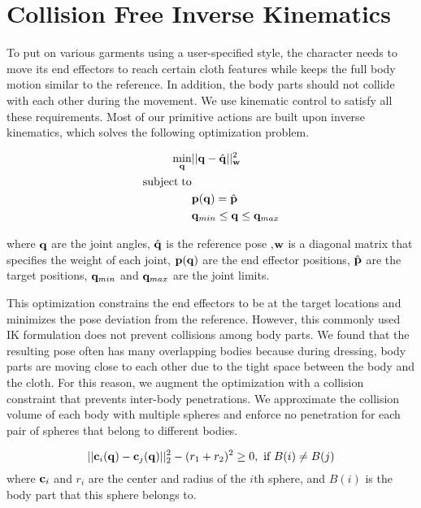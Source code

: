 \section{Collision Free Inverse Kinematics}

To put on various garments using a user-specified style, the character needs to move its end effectors to reach certain cloth features while keeps the full body motion similar to the reference. In addition, the body parts should not collide with each other during the movement. We use kinematic control to satisfy all these requirements. Most of our primitive actions are built upon inverse kinematics, which solves the following optimization problem.

\begin{align}
\label{eq:IK}
  \min_{\mathbf{q}} & ||\mathbf{q} - \hat{\mathbf{q}}||_{\mathbf{w}}^2 \\
  \nonumber  \mathrm{subject\;} \mathrm{to} & \\
  \nonumber  &\mathbf{p}(\mathbf{q}) = \hat{\mathbf{p}}\\
\nonumber   &\mathbf{q}_{min} \leq \mathbf{q} \leq \mathbf{q}_{max}
\end{align}

where $\mathbf{q}$ are the joint angles, $\hat{\mathbf{q}}$ is the reference pose ,$\mathbf{w}$ is a diagonal matrix that specifies the weight of each joint, $\mathbf{p}(\mathbf{q})$ are the end effector positions, $\hat{\mathbf{p}}$ are the target positions, $\mathbf{q}_{min}$ and $\mathbf{q}_{max}$ are the joint limits.

This optimization constrains the end effectors to be at the target locations and minimizes the pose deviation from the reference. However, this commonly used IK formulation does not prevent collisions among body parts. We found that the resulting pose often has many overlapping bodies because during dressing, body parts are moving close to each other due to the tight space between the body and the cloth. For this reason, we augment the optimization with a collision constraint that prevents inter-body penetrations. We approximate the collision volume of each body with multiple spheres and enforce no penetration for each pair of spheres that belong to different bodies.

\begin{equation}
  ||\mathbf{c}_i(\mathbf{q}) - \mathbf{c}_j(\mathbf{q})||_2^2 - (r_1 + r_2)^2 \geq 0,\mbox{ if }B(i) \neq B(j)
  \label{eq:collision}
\end{equation}
where $\mathbf{c}_i$ and $r_i$ are the center and radius of the $i$th sphere, and $B(i)$ is the body part that this sphere belongs to.
 
